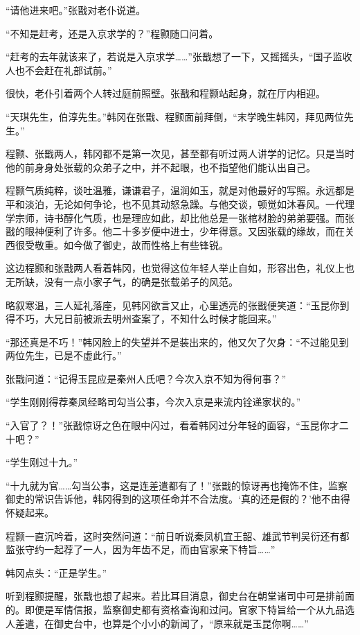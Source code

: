 “请他进来吧。”张戬对老仆说道。

“不知是赶考，还是入京求学的？”程颢随口问着。

“赶考的去年就该来了，若说是入京求学……”张戬想了一下，又摇摇头，“国子监收人也不会赶在礼部试前。”

很快，老仆引着两个人转过庭前照壁。张戬和程颢站起身，就在厅内相迎。

“天琪先生，伯淳先生。”韩冈在张戬、程颢面前拜倒，“末学晚生韩冈，拜见两位先生。”

程颢、张戬两人，韩冈都不是第一次见，甚至都有听过两人讲学的记忆。只是当时他的前身身处张载的众弟子之中，并不起眼，也不指望他们能认出自己。

程颢气质纯粹，谈吐温雅，谦谦君子，温润如玉，就是对他最好的写照。永远都是平和淡泊，无论如何争论，也不见其动怒急躁。与他交谈，顿觉如沐春风。一代理学宗师，诗书醇化气质，也是理应如此，却比他总是一张棺材脸的弟弟要强。而张戬的眼神便利了许多。他二十多岁便中进士，少年得意。又因张载的缘故，而在关西很受敬重。如今做了御史，故而性格上有些锋锐。

这边程颢和张戬两人看着韩冈，也觉得这位年轻人举止自如，形容出色，礼仪上也无所缺，没有一点小家子气，的确是张载弟子的风范。

略叙寒温，三人延礼落座，见韩冈欲言又止，心里透亮的张戬便笑道：“玉昆你到得不巧，大兄日前被派去明州查案了，不知什么时候才能回来。”

“那还真是不巧！”韩冈脸上的失望并不是装出来的，他又欠了欠身：“不过能见到两位先生，已是不虚此行。”

张戬问道：“记得玉昆应是秦州人氏吧？今次入京不知为得何事？”

“学生刚刚得荐秦凤经略司勾当公事，今次入京是来流内铨递家状的。”

“入官了？！”张戬惊讶之色在眼中闪过，看着韩冈过分年轻的面容，“玉昆你才二十吧？”

“学生刚过十九。”

“十九就为官……勾当公事，这是连差遣都有了！”张戬的惊讶再也掩饰不住，监察御史的常识告诉他，韩冈得到的这项任命并不合法度。‘真的还是假的？’他不由得怀疑起来。

程颢一直沉吟着，这时突然问道：“前日听说秦凤机宜王韶、雄武节判吴衍还有都监张守约一起荐了一人，因为年齿不足，而由官家亲下特旨……”

韩冈点头：“正是学生。”

听到程颢提醒，张戬也想了起来。若比耳目消息，御史台在朝堂诸司中可是排前面的。即便是军情信报，监察御史都有资格查询和过问。官家下特旨给一个从九品选人差遣，在御史台中，也算是个小小的新闻了，“原来就是玉昆你啊……”

